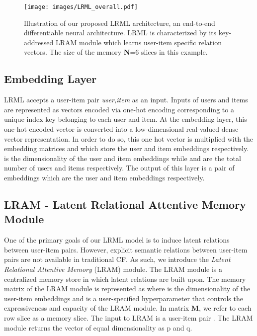 \documentclass[sigconf]{acmart}
\begin{document}
\begin{figure}[ht]
\begin{center}
\texttt{[image: images/LRML\_overall.pdf]}
\caption{Illustration of our proposed \textsc{LRML} architecture, an end-to-end differentiable neural architecture. LRML is characterized by its key-addressed LRAM module which learns user-item specific relation vectors. The size of the memory \textbf{N}=6 slices in this example.}
\label{fig:transrec}
\end{center}
\end{figure}


\subsection{Embedding Layer}
\textsc{LRML} accepts a user-item pair \emph{ user,item } as an input. Inputs of users and items are 
represented as vectors encoded via one-hot encoding corresponding to a unique index key belonging to each user and item. At the 
embedding layer, this one-hot encoded vector is converted into a low-dimensional real-valued dense vector representation. 
In order to do so, this one hot vector is multiplied with the embedding matrices 
and  which store the user and item embeddings respectively.  is the dimensionality of
the user and item embeddings while  and  are the total number of users and items respectively. The output of this layer is a pair
of embeddings  which are the user and item embeddings respectively.   


\subsection{LRAM - Latent Relational Attentive Memory Module}
One of the primary goals of our \textsc{LRML} model is to induce latent relations between user-item pairs. However, explicit semantic relations between user-item pairs are not available in traditional CF. As such, we introduce the \emph{Latent Relational Attentive Memory} (LRAM) module. The LRAM module is a centralized memory store in which latent relations are built upon. The memory matrix of the LRAM module is represented as  where  is the dimensionality of the user-item embeddings and  is a user-specified hyperparameter that controls the expressiveness and capacity of the LRAM module. In matrix \textbf{M}, we refer to each row slice  as a memory slice. The input to LRAM is a user-item pair . The LRAM module returns the vector  of equal dimensionality as p and q. 
\end{document}
